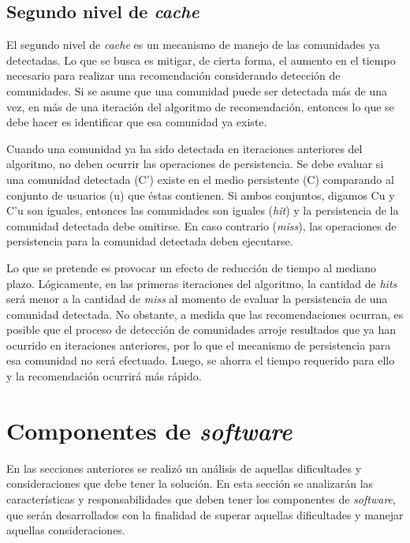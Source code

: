 \subsection{Segundo nivel de \textit{cache}}

El segundo nivel de \textit{cache} es un mecanismo de manejo de las comunidades ya detectadas. Lo que se busca es mitigar, de cierta forma, el aumento en el tiempo necesario para realizar una recomendación considerando detección de comunidades. Si se asume que una comunidad puede ser detectada más de una vez, en más de una iteración del algoritmo de recomendación, entonces lo que se debe hacer es identificar que esa comunidad ya existe.

Cuando una comunidad ya ha sido detectada en iteraciones anteriores del algoritmo, no deben ocurrir las operaciones de persistencia. Se debe evaluar si una comunidad detectada (C’) existe en el medio persistente (C) comparando al conjunto de usuarios (u) que éstas contienen.  Si ambos conjuntos, digamos Cu y C’u son iguales, entonces las comunidades son iguales (\textit{hit}) y la persistencia de la comunidad detectada debe omitirse. En caso contrario (\textit{miss}), las operaciones de persistencia para la comunidad detectada deben ejecutarse.

Lo que se pretende es provocar un efecto de reducción de tiempo al mediano plazo. Lógicamente, en las primeras iteraciones del algoritmo, la cantidad de \textit{hits} será menor a la cantidad de \textit{miss} al momento de evaluar la persistencia de una comunidad detectada. No obstante, a medida que las recomendaciones ocurran, es posible que el proceso de detección de comunidades arroje resultados que ya han ocurrido en iteraciones anteriores, por lo que el mecanismo de persistencia para esa comunidad no será efectuado. Luego, se ahorra el tiempo requerido para ello y la recomendación ocurrirá más rápido.

\section{Componentes de \textit{software}}

En las secciones anteriores se realizó un análisis de aquellas dificultades y consideraciones que debe tener la solución. En esta sección se analizarán las características y responsabilidades que deben tener los componentes de \textit{software}, que serán desarrollados con la finalidad de superar aquellas dificultades y manejar aquellas consideraciones.

